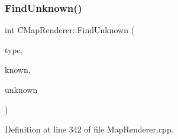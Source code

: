 \subsubsection{\texorpdfstring{Find\+Unknown()}{FindUnknown()}}
{\footnotesize\ttfamily int C\+Map\+Renderer\+::\+Find\+Unknown (\begin{DoxyParamCaption}\item[{\hyperlink{classCTerrainMap_aff2ab991e237269941416dd79d8871d4}{C\+Terrain\+Map\+::\+E\+Tile\+Type}}]{type,  }\item[{int}]{known,  }\item[{int}]{unknown }\end{DoxyParamCaption})\hspace{0.3cm}{\ttfamily [protected]}}



Definition at line 342 of file Map\+Renderer.\+cpp.


